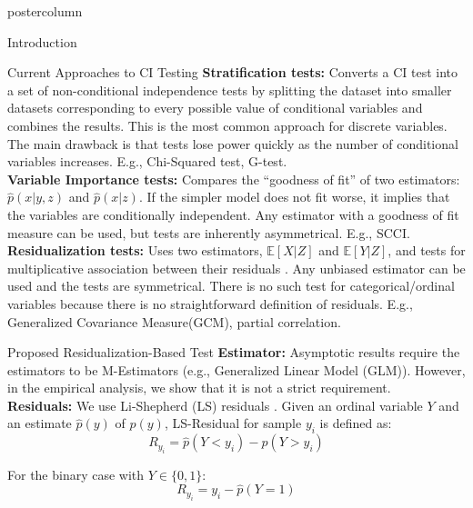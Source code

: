 \documentclass{beamer}
\begin{document}
\begin{frame}
\begin{columns}
\begin{column}{.33\textwidth}
\begin{beamercolorbox}[center]{postercolumn}
\begin{minipage}{.98\textwidth}
{\begin{myblock}{Introduction}
	\end{myblock}\vfill
	\begin{myblock}{Current Approaches to CI Testing}
		\justifying \textbf{Stratification tests:} Converts a CI
				test into a set of non-conditional independence
				tests by splitting the dataset into smaller
				datasets corresponding to every possible value
				of conditional variables and combines
				the results. This is the most common approach
				for discrete variables. The main drawback is
				that tests lose power quickly as the number
				of conditional variables increases. E.g.,
				Chi-Squared test, G-test. \\
				\vspace{0.8em}
		\justifying \textbf{Variable Importance tests:} Compares
				the ``goodness of fit'' of two
				estimators: $ \hat{p}(x | y, z) $ and $
				\hat{p}(x|z) $. If the simpler model does not
				fit worse, it implies that the variables are
				conditionally independent. 
				Any estimator with a goodness of fit measure
				can be used, but tests are inherently
				asymmetrical. E.g., SCCI. \\
				\vspace{0.8em}
		\justifying \textbf{Residualization tests:} Uses two
				estimators, $ \mathbb{E}[X | Z] $ and $
				\mathbb{E}[Y|Z] $, and tests for multiplicative
				association between their residuals
				\cite{Daudin1980}. Any unbiased estimator can
				be used and the tests are symmetrical. There is
				no such test for categorical/ordinal variables because
				there is no straightforward definition of
				residuals. E.g., Generalized Covariance
				Measure(GCM), partial correlation.
	\end{myblock}\vfill
	\begin{myblock}{Proposed Residualization-Based Test}
		\justifying \textbf{Estimator:} Asymptotic results require
				the estimators to be M-Estimators (e.g.,
				Generalized Linear Model (GLM)). However, in
				the empirical analysis, we show that it is not a
				strict requirement. \\
				\vspace{0.8em}
		\justifying \textbf{Residuals:} We use Li-Shepherd (LS) residuals \cite{li2012}.
				Given an ordinal variable $ Y $ and an estimate $ \hat{p}(y) $ of $
				p(y) $, LS-Residual for sample $ y_i $ is defined as:
				$$ R_{y_i} = \hat{p}(Y < y_i) - \hat{p}(Y > y_i) $$

				For the binary case with $ Y \in \{0, 1\} $:
				$$ R_{y_i} = y_i - \hat{p}(Y = 1) $$


\end{myblock}}
\end{minipage}
\end{beamercolorbox}
\end{column}
\end{columns}
\end{frame}
\end{document}
